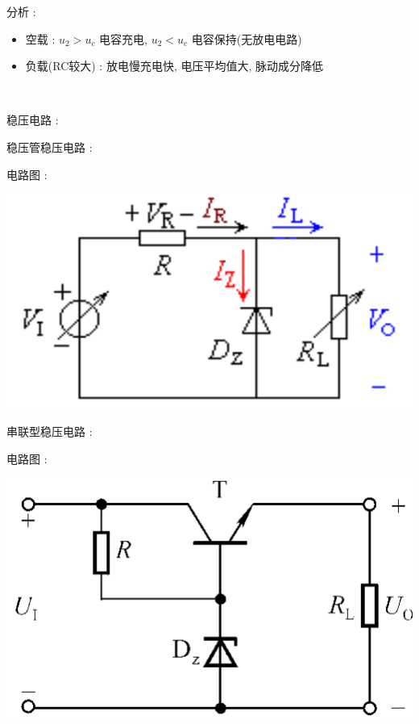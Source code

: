 \documentclass[UTF8, 12pt]{ctexart}
\begin{document}
	分析 :
	\begin{itemize}[leftmargin = 4em]
		\item 空载 : $ u_{2} > u_{c} $ 电容充电, $ u_{2} < u_{c} $ 电容保持(无放电电路)
		\item 负载(RC较大) : 放电慢充电快, 电压平均值大, 脉动成分降低
	\end{itemize}

	~

	\noindent
	稳压电路 :
	
	稳压管稳压电路 :

	电路图 :

	\includegraphics[scale = 0.4]{08/稳压管稳压电路电路图.png}

	串联型稳压电路 :

	电路图 :

	\includegraphics[scale = 0.4]{08/串联型稳压电路.png}
\end{document}
